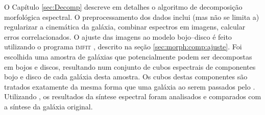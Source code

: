 O Capítulo \ref{sec:Decomp} descreve em detalhes o algoritmo de decomposição
morfológica espectral. O preprocessamento dos dados inclui (mas não se limita a)
regularizar a cinemática da galáxia, combinar espectros em imagens, calcular
erros correlacionados. O ajuste das imagens ao modelo bojo--disco é feito
utilizando o programa \textsc{imfit} \citep{Erwin2015}, descrito na seção
\ref{sec:morph:comp:ajuste}. Foi escolhida uma amostra de galáxias que
potencialmente podem ser decompostas em bojos e discos, resultando num conjunto
de cubos espectrais de componentes bojo e disco de cada galáxia desta amostra.
Os cubos destas componentes são tratados exatamente da mesma forma que uma
galáxia ao serem passados pelo \starlight. Utilizando \pycasso, os resultados da
síntese espectral foram analisados e comparados com a síntese da galáxia
original.

%
% 

